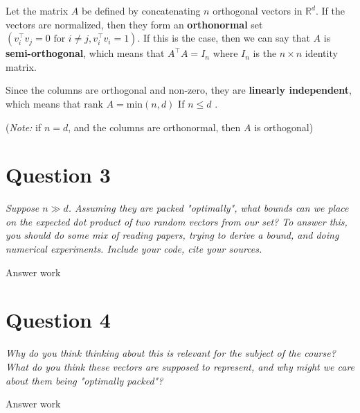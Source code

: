 \documentclass[hidelinks]{article}
\begin{document}
	{} Let the matrix $A$ be defined by concatenating $n$ orthogonal vectors in $\mathbb{R}^d$. If the vectors are normalized, then they form an \textbf{orthonormal} set $(v_i ^\intercal v_j = 0 \text{ for } i \ne j, v_i ^\intercal v_i = 1)$. If this is the case, then we can say that $A$ is \textbf{semi-orthogonal}, which means that $A ^\intercal A = I_n$ where $I_n$ is the $n\times n$ identity matrix. 
	
	Since the columns are orthogonal and non-zero, they are \textbf{linearly independent}, which means that \textbf{$\text{rank } A = \text{min}(n,d)$} If $n \le d$ .
	
	(\textit{Note:} if $n = d$, and the columns are orthonormal, then $A$ is orthogonal)
	

	
	\section{Question 3}
	
	\textit{Suppose $n\gg d$. Assuming they are packed "optimally", what bounds can we place on the expected dot product of two random vectors from our set? To answer this, you should do some mix of reading papers, trying to derive a bound, and doing numerical experiments. Include your code, cite your sources.}
	
	{\color{SkyBlue}
		Answer work
		
	}
	
	\section{Question 4}
	\textit{Why do you think thinking about this is relevant for the subject of the course? What do you think these vectors are supposed to represent, and why might we care about them being "optimally packed"?}
	
	{\color{SkyBlue}
		Answer work
		
	}
	
\end{document}
